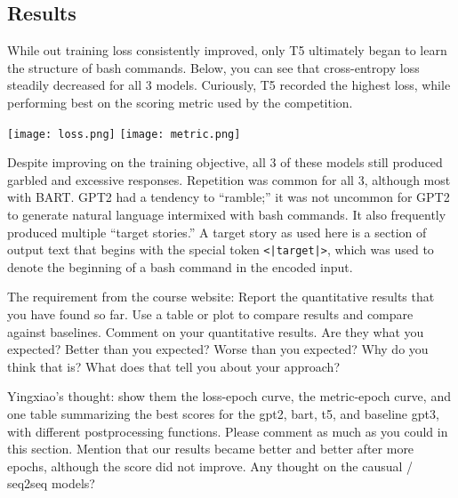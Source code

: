 \documentclass{article}
\begin{document}
\subsection{Results}
While out training loss consistently improved, only T5 ultimately began to
learn the structure of bash commands. Below, you can see that cross-entropy
loss steadily decreased for all 3 models. Curiously, T5 recorded the highest
loss, while performing best on the scoring metric used by the competition.
\begin{center}
	\texttt{[image: loss.png]}
	\texttt{[image: metric.png]}
\end{center}
Despite improving on the training objective, all 3 of these models still produced garbled and excessive responses. Repetition was common for all 3, although most with BART. GPT2 had a tendency to ``ramble;'' it was not uncommon for GPT2 to generate natural language intermixed with bash commands. It also frequently produced multiple ``target stories.'' A target story as used here is a section of output text that begins with the special token \texttt{<|target|>}, which was used to denote the beginning of a bash command in the encoded input.

The requirement from the course website: Report the quantitative results that you have found so far. Use a table or plot to compare results and compare against baselines.
Comment on your quantitative results. Are they what you expected? Better than you expected? Worse than you expected? Why do you think that is? What does that tell you about your approach?

Yingxiao's thought: show them the loss-epoch curve, the metric-epoch curve, and one table summarizing the best scores for the gpt2, bart, t5, and baseline gpt3, with different postprocessing functions. Please comment as much as you could in this section. Mention that our results became better and better after more epochs, although the score did not improve. Any thought on the causual / seq2seq models?
\end{document}
